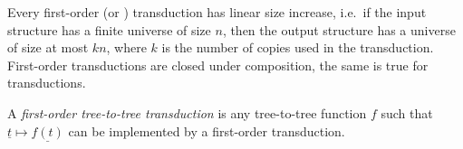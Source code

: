 Every first-order (or \mso) transduction has linear size increase, i.e.~if the input structure has a finite universe of size $n$, then the output structure has a universe of size at most $kn$, where $k$ is the number of copies used in the transduction. First-order transductions are closed under composition, the same is true for \mso transductions. 

\begin{definition}
    A \emph{first-order tree-to-tree transduction} is any tree-to-tree  function $f$ such that $\underline t \mapsto \underline{f(t)}$
can be implemented by a first-order transduction.     
\end{definition}



